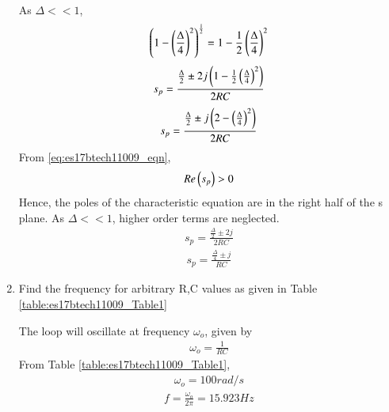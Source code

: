 \begin{enumerate}[label=\arabic*.,ref=\theenumi]
\begin{align}
 \end{align}
 As $\Delta << 1$, 
 \begin{align}
     \left(1-\left(\frac{\Delta}{4}\right)^2\right)^\frac{1}{2} = 1 - \frac{1}{2}\left(\frac{\Delta}{4}\right)^2
 \end{align}
 \begin{align}
 s_{p} = \frac{\frac{\Delta}{2} \pm 2j\left(1 - \frac{1}{2}\left(\frac{\Delta}{4}\right)^2\right)}{2RC}
 \end{align}
 \begin{align}
  s_{p}= \frac{\frac{\Delta}{2} \pm j\brak{2 - \brak{\frac{\Delta}{4}}^2}}{2RC}
  \label{eq:es17btech11009_eqn}
 \end{align}
 From \eqref{eq:es17btech11009_eqn},
 \begin{align}
     Re\left(s_{p}\right) > 0
 \end{align}
 Hence, the poles of the characteristic equation are in the right half of the s plane.
 As $\Delta << 1$, higher order terms are neglected.
 \begin{align}
     s_{p} = \frac{\frac{\Delta}{2} \pm 2j}{2RC}
 \end{align}
 \begin{align}
     s_{p} = \frac{\frac{\Delta}{4} \pm j}{RC}
 \end{align}
 
\item 
Find the frequency for arbitrary R,C values as given in Table \ref{table:es17btech11009_Table1}
\begin{table}[!ht]
\centering

\caption{}
\label{table:es17btech11009_Table1}
\end{table}

The loop will oscillate at frequency $\omega_{o}$, given by
\begin{align}
    \omega_{o} = \frac{1}{RC}
\end{align}
From Table \ref{table:es17btech11009_Table1},
\begin{align}
    \omega_{o} = 100 rad/s
\end{align}
\begin{align}
    f = \frac{\omega_{o}}{2\pi} = 15.923 Hz
\end{align}


\end{enumerate}

